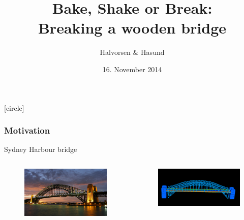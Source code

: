 \documentclass[screen]{beamer}
\title[The Finite Element Method]%
{Bake, Shake or Break: \\Breaking a wooden bridge}
\author[Halvorsen \& Hasund]{Halvorsen \& Hasund}
\institute[NTNU]{The Finite Element Method project}
\date{16. November 2014}
\begin{document}
[circle]

\ntnutitlepage


\begin{frame}
\frametitle{Motivation}

 Sydney Harbour bridge
\begin{columns}   
    \begin{column}{.5\linewidth}
        \begin{figure}
  		\includegraphics[scale=0.25]{figures/Sydney_pic}
  		\end{figure}
    \end{column}   
    \begin{column}{.5\linewidth}

        \begin{figure}
  		\includegraphics[scale=0.12]{figures/sydneyBridge}
  		\end{figure}
    \end{column}
  \end{columns}
\end{frame}
\end{document}
